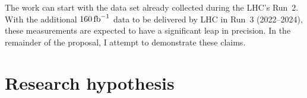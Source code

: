 \documentclass[a4paper,11pt]{article}
\newcommand{\Pb}{{{\Pqb}}\xspace}
\newcommand{\PAb}{{{{\Paqb}}}\xspace}
\renewcommand{\PV}{{{{V}}}\xspace}
\newcommand{\VH}{{{\PV}{\PH}}\xspace}
\begin{document}



The work can start with the data set already collected during the LHC's Run~2. 
With the additional $160\mbox{\ensuremath{\,\text{fb}^{-1}}}$ data to be delivered by LHC in Run~3 (2022--2024), these measurements are expected to have a significant leap in precision. In the remainder of the proposal, I attempt to demonstrate these claims.


\section{Research hypothesis}
\label{sec:research_hypo}

\end{document}

